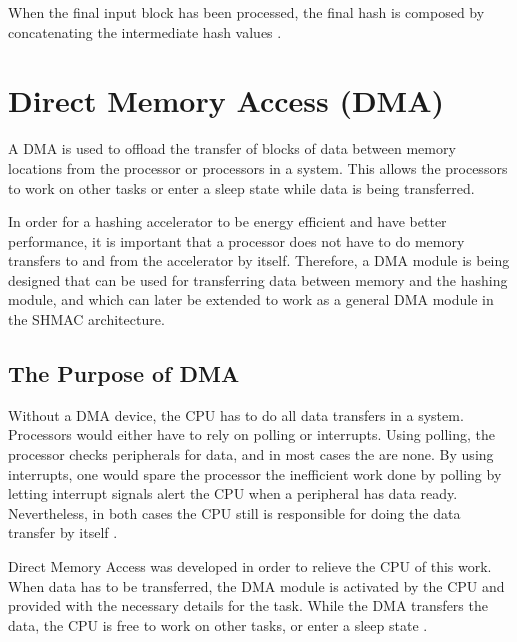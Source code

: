 When the final input block has been processed, the final hash is composed by
concatenating the intermediate hash values \cite{sha-spec}.

\section{Direct Memory Access (DMA)}

A DMA is used to offload the transfer of blocks of data between memory locations from
the processor or processors in a system. This allows the processors to work on other tasks or enter
a sleep state while data is being transferred.

In order for a hashing accelerator to be energy efficient and have better performance,
it is important that a processor does not have to do memory transfers to and from the accelerator by itself. Therefore,
a DMA module is being designed that can be used for transferring data between memory and the hashing
module, and which can later be extended to work as a general DMA module in the SHMAC architecture.

\subsection{The Purpose of DMA}

Without a DMA device, the CPU has to do all data transfers in a system.
Processors would either have to rely on polling or interrupts.
Using polling, the processor checks peripherals for data, and in most cases the are none.
By using interrupts, one would spare the processor the inefficient work done by polling by letting interrupt signals alert the CPU when a peripheral has data ready.
Nevertheless, in both cases the CPU still is responsible for doing the data transfer by itself \cite{computer-construction}.



Direct Memory Access was developed in order to relieve the CPU of this work.
When data has to be transferred, the DMA module is activated by the CPU and provided with the necessary details for the task.
While the DMA transfers the data, the CPU is free to work on other tasks, or enter a sleep state \cite{computer-construction}.

